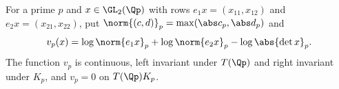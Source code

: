 For a prime $p$ and $x\in\GL_2(\Qp)$ with rows $e_1x=(x_{11},x_{12})$ and $e_2x=(x_{21},x_{22})$, put $\norm{(c,d)}_p=\max(\abs c_p,\abs d_p)$ and
\[
  v_p(x)=\log\norm{e_1x}_p+\log\norm{e_2x}_p-\log\abs{\det x}_p .
\]
The function $v_p$ is continuous, left invariant under $T(\Qp)$ and right invariant under $K_p$, and $v_p=0$ on $T(\Qp)K_p$.
